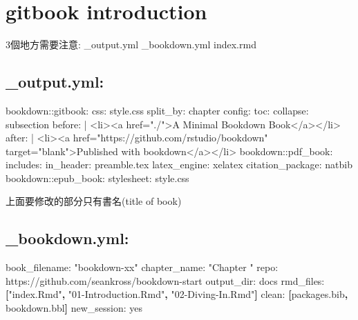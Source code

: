 \documentclass[]{book}
\newenvironment{Shaded}{\begin{snugshade}}{\end{snugshade}}
\newcommand{\AttributeTok}[1]{\textcolor[rgb]{0.77,0.63,0.00}{#1}}
\newcommand{\FunctionTok}[1]{\textcolor[rgb]{0.00,0.00,0.00}{#1}}
\newcommand{\KeywordTok}[1]{\textcolor[rgb]{0.13,0.29,0.53}{\textbf{#1}}}
\newcommand{\NormalTok}[1]{#1}
\newcommand{\StringTok}[1]{\textcolor[rgb]{0.31,0.60,0.02}{#1}}
\theoremstyle{definition}
\theoremstyle{definition}
\theoremstyle{definition}
\theoremstyle{remark}
\begin{document}
\hypertarget{gitbook-introduction}{%
\chapter{gitbook introduction}\label{gitbook-introduction}}

3個地方需要注意: \_output.yml \_bookdown.yml index.rmd

\hypertarget{output.yml}{%
\section{\_output.yml:}\label{output.yml}}

\begin{Shaded}
\begin{Highlighting}[]
\FunctionTok{bookdown:}\AttributeTok{:gitbook:}
  \FunctionTok{css:}\AttributeTok{ style.css}
  \FunctionTok{split_by:}\AttributeTok{ chapter}
  \FunctionTok{config:}
    \FunctionTok{toc:}
      \FunctionTok{collapse:}\AttributeTok{ subsection}
      \FunctionTok{before:}\AttributeTok{ |}
\NormalTok{        <li><a href=}\StringTok{"./"}\NormalTok{>A Minimal Bookdown Book</a></li>}
      \FunctionTok{after:}\AttributeTok{ |}
        \FunctionTok{<li><a href="https:}\AttributeTok{//github.com/rstudio/bookdown" target="blank">Published with bookdown</a></li>}
\FunctionTok{bookdown:}\AttributeTok{:pdf_book:}
  \FunctionTok{includes:}
    \FunctionTok{in_header:}\AttributeTok{ preamble.tex}
  \FunctionTok{latex_engine:}\AttributeTok{ xelatex}
  \FunctionTok{citation_package:}\AttributeTok{ natbib}
\FunctionTok{bookdown:}\AttributeTok{:epub_book:}
  \FunctionTok{stylesheet:}\AttributeTok{ style.css}
  
\end{Highlighting}
\end{Shaded}

上面要修改的部分只有書名(title of book)

\hypertarget{bookdown.yml}{%
\section{\_bookdown.yml:}\label{bookdown.yml}}

\begin{Shaded}
\begin{Highlighting}[]

\FunctionTok{book_filename:}\AttributeTok{ }\StringTok{"bookdown-xx"}
\FunctionTok{chapter_name:}\AttributeTok{ }\StringTok{"Chapter "}
\FunctionTok{repo:}\AttributeTok{ https://github.com/seankross/bookdown-start}
\FunctionTok{output_dir:}\AttributeTok{ docs}
\FunctionTok{rmd_files:}\AttributeTok{ }\KeywordTok{[}\StringTok{"index.Rmd"}\KeywordTok{,} \StringTok{"01-Introduction.Rmd"}\KeywordTok{,} \StringTok{"02-Diving-In.Rmd"}\KeywordTok{]}
\FunctionTok{clean:}\AttributeTok{ }\KeywordTok{[}\NormalTok{packages.bib}\KeywordTok{,}\NormalTok{ bookdown.bbl}\KeywordTok{]}
\FunctionTok{new_session:}\AttributeTok{ yes}
\end{Highlighting}
\end{Shaded}
\end{document}

